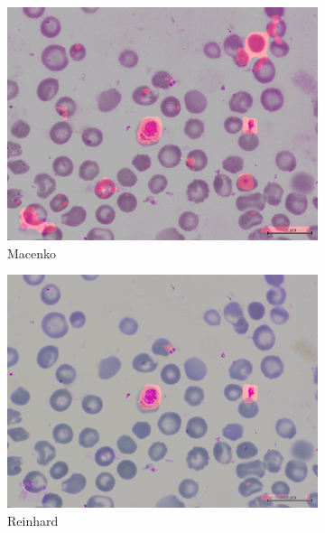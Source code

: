 \documentclass{nitk}
\begin{document}
\begin{figure}
    \centering
    \begin{subfigure}{0.3\textwidth}
    \includegraphics[width=\linewidth]{images/macenko_0a747cb3-c720-4572-a661-ab5670a5c42e.png}
    \caption{Macenko}
    \end{subfigure} \hfill
    \begin{subfigure}{0.3\textwidth}
    \includegraphics[width=\linewidth]{images/reinhard_0a747cb3-c720-4572-a661-ab5670a5c42e.png}
    \caption{Reinhard}
    \end{subfigure} \hfill
    \begin{subfigure}{0.3\textwidth}

\end{subfigure}
\end{figure}
\end{document}
